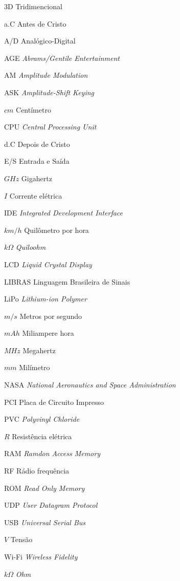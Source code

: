 \documentclass[
	12pt,				%
	openright,			%
	oneside,			%
	a4paper,			%
	english,			%
	brazil				%
	]{abntex2}
\begin{document}
\begin{siglas}

	\item[3D]Tridimencional
	\item[a.C]Antes de Cristo
	\item[A/D]Analógico-Digital
	\item[AGE]\textit{Abrams/Gentile Entertainment}
	\item[AM]\textit{Amplitude Modulation}
	\item[ASK]\textit{Amplitude-Shift Keying}
	\item[$cm$]Centímetro
	\item[CPU]\textit{Central Processing Unit}
	\item[d.C]Depois de Cristo
	\item[E/S]Entrada e Saída
	\item[$GHz$]Gigahertz
	\item[$I$]Corrente elétrica
	\item[IDE]\textit{Integrated Development Interface}
	\item[$km/h$]Quilômetro por hora
	\item[$k\Omega$]\textit{Quiloohm}
	\item[LCD]\textit{Liquid Crystal Display}
	\item[LIBRAS]Linguagem Brasileira de Sinais
	\item[LiPo]\textit{Lithium-ion Polymer}
	\item[$m/s$]Metros por segundo
	\item[$mAh$]Miliampere hora
	\item[$MHz$]Megahertz
	\item[$mm$]Milímetro
	\item[NASA]\textit{National Aeronautics and Space Administration}
	\item[PCI]Placa de Circuito Impresso
	\item[PVC]\textit{Polyvinyl Chloride}			
	\item[$R$]Resistência elétrica
	\item[RAM]\textit{Ramdon Access Memory}
	\item[RF]Rádio frequência
	\item[ROM]\textit{Read Only Memory}
	\item[UDP]\textit{User Datagram Protocol}
	\item[USB]\textit{Universal Serial Bus}
	\item[$V$]Tensão
	\item[Wi-Fi]\textit{Wireless Fidelity}
	\item[$k\Omega$]\textit{Ohm}

	
\end{siglas}
\end{document}

